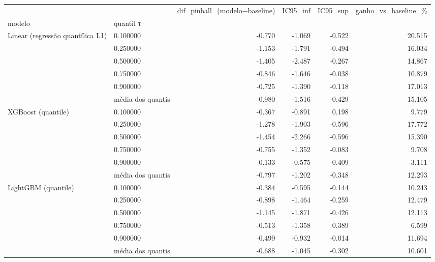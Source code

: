 \begin{tabular}{llrrrr}
\toprule
 &  & dif\_pinball\_(modelo−baseline) & IC95\_inf & IC95\_sup & ganho\_vs\_baseline\_\% \\
modelo & quantil τ &  &  &  &  \\
\midrule
\multirow[t]{6}{*}{Linear (regressão quantílica L1)} & 0.100000 & -0.770 & -1.069 & -0.522 & 20.515 \\
 & 0.250000 & -1.153 & -1.791 & -0.494 & 16.034 \\
 & 0.500000 & -1.405 & -2.487 & -0.267 & 14.867 \\
 & 0.750000 & -0.846 & -1.646 & -0.038 & 10.879 \\
 & 0.900000 & -0.725 & -1.390 & -0.118 & 17.013 \\
 & média dos quantis & -0.980 & -1.516 & -0.429 & 15.105 \\
\cline{1-6}
\multirow[t]{6}{*}{XGBoost (quantile)} & 0.100000 & -0.367 & -0.891 & 0.198 & 9.779 \\
 & 0.250000 & -1.278 & -1.903 & -0.596 & 17.772 \\
 & 0.500000 & -1.454 & -2.266 & -0.596 & 15.390 \\
 & 0.750000 & -0.755 & -1.352 & -0.083 & 9.708 \\
 & 0.900000 & -0.133 & -0.575 & 0.409 & 3.111 \\
 & média dos quantis & -0.797 & -1.202 & -0.348 & 12.293 \\
\cline{1-6}
\multirow[t]{6}{*}{LightGBM (quantile)} & 0.100000 & -0.384 & -0.595 & -0.144 & 10.243 \\
 & 0.250000 & -0.898 & -1.464 & -0.259 & 12.479 \\
 & 0.500000 & -1.145 & -1.871 & -0.426 & 12.113 \\
 & 0.750000 & -0.513 & -1.358 & 0.389 & 6.599 \\
 & 0.900000 & -0.499 & -0.932 & -0.014 & 11.694 \\
 & média dos quantis & -0.688 & -1.045 & -0.302 & 10.601 \\
\cline{1-6}
\bottomrule
\end{tabular}
